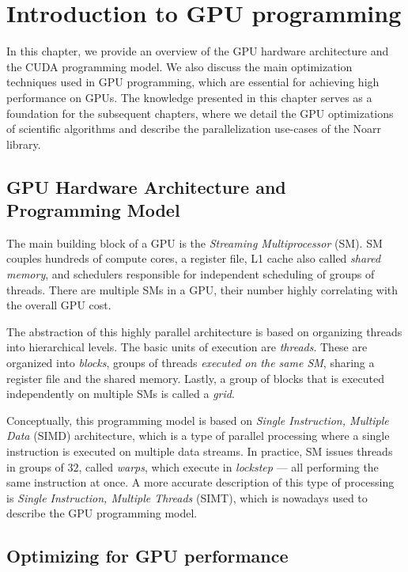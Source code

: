 \chapter{Introduction to GPU programming}
\label{chap:gpu_intro}

In this chapter, we provide an overview of the GPU hardware architecture and the CUDA programming model. We also discuss the main optimization techniques used in GPU programming, which are essential for achieving high performance on GPUs. The knowledge presented in this chapter serves as a foundation for the subsequent chapters, where we detail the GPU optimizations of scientific algorithms and describe the parallelization use-cases of the Noarr library.

\section{GPU Hardware Architecture and Programming Model}
\label{sec:gpu_arch}


The main building block of a GPU is the \emph{Streaming Multiprocessor} (SM). SM couples hundreds of compute cores, a register file, L1 cache also called \emph{shared memory}, and schedulers responsible for independent scheduling of groups of threads. There are multiple SMs in a GPU, their number highly correlating with the overall GPU cost.

The abstraction of this highly parallel architecture is based on organizing threads into hierarchical levels. The basic units of execution are \emph{threads}. These are organized into \emph{blocks}, groups of threads \emph{executed on the same SM}, sharing a register file and the shared memory. Lastly, a group of blocks that is executed independently on multiple SMs is called a \emph{grid}.

Conceptually, this programming model is based on \emph{Single Instruction, Multiple Data} (SIMD) architecture, which is a type of parallel processing where a single instruction is executed on multiple data streams. In practice, SM issues threads in groups of $32$, called \emph{warps}, which execute in \emph{lockstep} --- all performing the same instruction at once. A more accurate description of this type of processing is \emph{Single Instruction, Multiple Threads} (SIMT), which is nowadays used to describe the GPU programming model.

\section{Optimizing for GPU performance}
\label{sec:gpu_optim}

